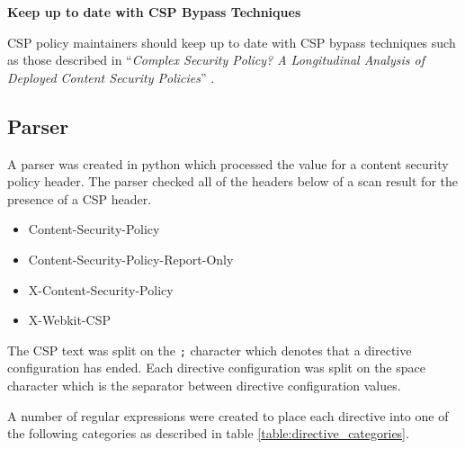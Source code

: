 \documentclass{mscreport}
\begin{document}
\vspace{0.5cm} \noindent
\textbf{Keep up to date with CSP Bypass Techniques}

\vspace{0.3cm} \noindent
CSP policy maintainers should keep up to date with CSP bypass techniques such as those described in  ``\textit{Complex Security Policy? A Longitudinal Analysis of Deployed Content Security Policies}'' \cite{Roth2020-hg}.

\subsection{Parser}

A parser was created in python which processed the value for a content security policy header. The parser checked all of the headers below of a scan result for the presence of a CSP header.

\begin{itemize}
	\setlength\itemsep{0.1em}
	\item Content-Security-Policy
	\item Content-Security-Policy-Report-Only
	\item X-Content-Security-Policy
	\item X-Webkit-CSP
\end{itemize}

\noindent
The CSP text was split on the \texttt{;} character which denotes that a directive configuration has ended. Each directive configuration was split on the space character which is the separator between directive configuration values.

\vspace{0.3cm} \noindent
A number of regular expressions were created to place each directive into one of the following categories as described in table \ref{table:directive_categories}.

\newpage
\end{document}
